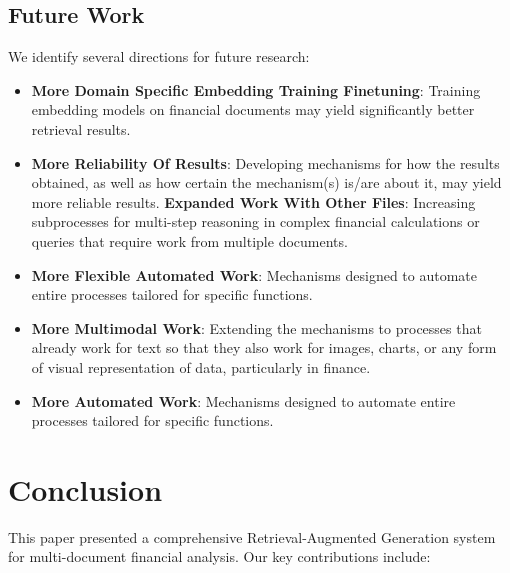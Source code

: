 \documentclass[runningheads]{llncs}
\begin{document}
\subsection{Future Work}

We identify several directions for future research:

\begin{itemize}
     \item\textbf{More Domain Specific Embedding Training Finetuning}: Training embedding models on financial documents may yield significantly better retrieval results. 

\item\textbf{More Reliability Of Results}: Developing mechanisms for how the results obtained, as well as how certain the mechanism(s) is/are about it, may yield more reliable results. \textbf{Expanded Work With Other Files}: Increasing subprocesses for multi-step reasoning in complex financial calculations or queries that require work from multiple documents. 

\item\textbf{More Flexible Automated Work}: Mechanisms designed to automate entire processes tailored for specific functions. 

\item\textbf{More Multimodal Work}: Extending the mechanisms to processes that already work for text so that they also work for images, charts, or any form of visual representation of data, particularly in finance. 

\item\textbf{More Automated Work}: Mechanisms designed to automate entire processes tailored for specific functions. 





\end{itemize}

\section{Conclusion}

This paper presented a comprehensive Retrieval-Augmented Generation system for multi-document financial analysis. Our key contributions include:
\end{document}
